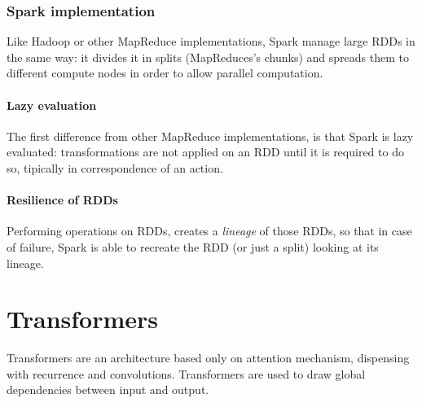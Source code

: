 \documentclass[\main/main.tex]{subfiles}
\begin{document}
\subsubsection{Spark implementation}
Like Hadoop or other MapReduce implementations, Spark manage large RDDs in the same way: it divides it in splits (MapReduces's chunks) and spreads them to different compute nodes in order to allow parallel computation.
\paragraph{Lazy evaluation}
The first difference from other MapReduce implementations, is that Spark is lazy evaluated: transformations are not applied on an RDD until it is required to do so, tipically in correspondence of an action.
\paragraph{Resilience of RDDs}
Performing operations on RDDs, creates a \textit{lineage} of those RDDs, so that in case of failure, Spark is able to recreate the RDD (or just a split) looking at its lineage.



\section{Transformers}
Transformers \allowbreak\cite{vaswani2017attention} are an architecture based only on attention mechanism, dispensing with recurrence and convolutions. Transformers are used to draw global dependencies between input and output.
\end{document}
